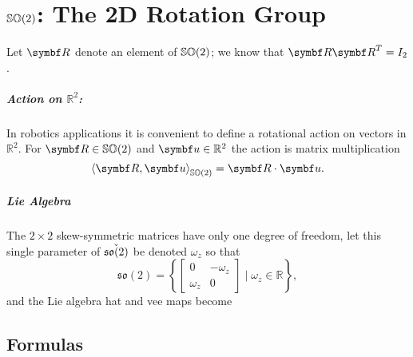 \chapter{\texorpdfstring{${\mathbb{SO}(2)}$}{SO(2)}: The 2D Rotation Group}

Let $\bR$ denote an element of ${\mathbb{SO}(2)}$; we know that $\bR \bR^{T} = I_{2}$.

\paragraph{Action on \texorpdfstring{$\mathbb{R}^2$}{R2}:}
In robotics applications it is convenient to define a rotational action on vectors in $\mathbb{R}^2$. For $\bR \in \SOtwo$ and $\bu \in \mathbb{R}^2$ the action is matrix multiplication
\begin{equation}
  \left \langle \bR, \bu \right \rangle_{\SOtwo} = \bR \cdot \bu.
\end{equation}

\paragraph{Lie Algebra}

The $2 \times 2$ skew-symmetric matrices have only one degree of freedom, let this single parameter of $\check{{\mathfrak{so}(2)}}$ be denoted $\omega_z$ so that
\begin{equation}
  \mathfrak{so}(2) = \left\{ \begin{bmatrix} 0 & -\omega_z \\ \omega_z & 0 \end{bmatrix} \mid \omega_z \in \mathbb{R} \right\},
\end{equation}
and the Lie algebra hat and vee maps become
\begin{center}
\end{center}
\section{Formulas}

